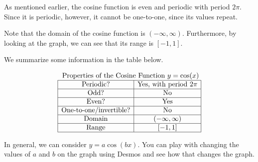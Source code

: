 \documentclass[nooutcomes]{ximera}
\begin{document}
As mentioned earlier, the cosine function is even and periodic with period $2\pi$. Since it is periodic, however, it cannot be one-to-one, since its values repeat.
 
 
Note that the domain of the cosine function is $(-\infty, \infty)$. Furthermore, by looking at the graph, we can see that its range is $[-1, 1]$.
 
We summarize some information in the table below.
 
\[
\begin{array}{ c }
 \text{ Properties of the Cosine Function } y=\cos(x) \\
\begin{array}{|c|c|}
 \hline
\text{Periodic?} & \text{Yes, with period }2\pi \\ \hline
\text{Odd?} & \text{No} \\ \hline
\text{Even?} & \text{Yes} \\ \hline
\text{One-to-one/invertible?} & \text{No} \\ \hline
\text{Domain} & (-\infty,\infty)\\ \hline
\text{Range} & [-1,1]\\ \hline
\end{array}
\end{array}
\]
 
In general, we can consider $y=a\cos(bx)$.  You can play with changing the values of $a$ and $b$ on the graph using Desmos and see how that changes the graph. 
 
\begin{center} 
\end{center}
\end{document}
